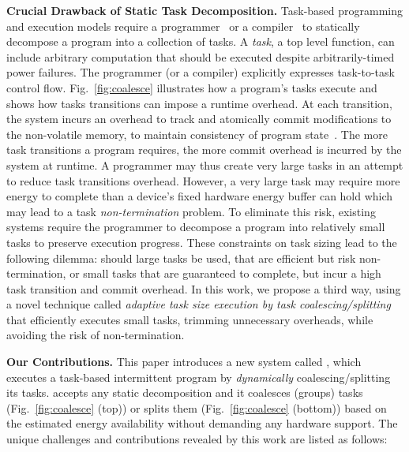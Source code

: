 \noindent\textbf{Crucial Drawback of Static Task Decomposition.} 
Task-based programming and execution models require a
programmer~\cite{alpaca,chain} or a compiler~\cite{baghsorkhi_cgo_2018} to
statically decompose a program into a collection of tasks. A \emph{task}, a top level function, can
include arbitrary computation that should be executed despite arbitrarily-timed power failures.
The programmer (or a compiler) explicitly expresses task-to-task control flow.
Fig.~\ref{fig:coalesce} illustrates how a program's tasks execute and
shows how tasks transitions can impose a runtime overhead. At each transition, the system incurs an overhead to track and atomically commit modifications to the non-volatile memory, to maintain consistency of program state~\cite{chain,alpaca}. The more task transitions a program requires, the more commit overhead is incurred by the system at runtime.
%
A programmer may thus create very large tasks in an attempt to reduce task transitions
overhead. However, a very large task may require more energy to complete than a device's fixed hardware energy
buffer can hold which may lead to a task \emph{non-termination} problem. To eliminate this risk,
existing systems require the programmer to decompose a program into relatively small tasks to preserve execution progress. These constraints on task sizing lead to the following dilemma: should large tasks be used, that are efficient but risk non-termination, or small tasks that are guaranteed to complete, but incur a high task transition and commit overhead. In this work,
we propose a third way, using a novel technique called \emph{adaptive task size execution by task coalescing/splitting} that efficiently executes small tasks, trimming unnecessary overheads, while avoiding the risk of non-termination.

\noindent\textbf{Our Contributions.}
This paper introduces a new system called \emph{\sys}, which executes a task-based
intermittent program by \emph{dynamically} coalescing/splitting its tasks.
\sys accepts any static decomposition and it coalesces (groups) tasks (Fig.~\ref{fig:coalesce} (top)) or splits them (Fig.~\ref{fig:coalesce} (bottom)) based on the estimated energy availability without demanding any hardware support. The unique challenges and contributions revealed by this work are listed as follows: 


